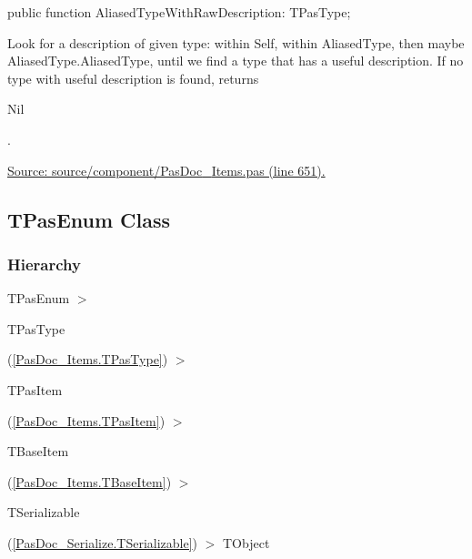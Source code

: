 \documentclass{report}
\newif\ifpdf
\begin{document}
\label{PasDoc_Items.TPasAliasType-AliasedTypeWithRawDescription}
\begin{list}{}{
\setlength{\itemindent}{0cm}
\setlength{\listparindent}{0cm}
\setlength{\leftmargin}{\evensidemargin}
\addtolength{\leftmargin}{\tmplength}
\settowidth{\labelsep}{X}
\addtolength{\leftmargin}{\labelsep}
\setlength{\labelwidth}{\tmplength}
}
\item[\textbf{Declaration}\hfill]
\ifpdf
\begin{flushleft}
\fi
\begin{ttfamily}
public function AliasedTypeWithRawDescription: TPasType;\end{ttfamily}

\ifpdf
\end{flushleft}
\fi

\par
\item[\textbf{Description}]
Look for a description of given type: within Self, within AliasedType, then maybe AliasedType.AliasedType, until we find a type that has a useful description. If no type with useful description is found, returns \begin{ttfamily}Nil\end{ttfamily}.\par
\href{https://github.com/pasdoc/pasdoc/blob/master/source/component/PasDoc_Items.pas#L651}{Source: source/component/PasDoc{\_}Items.pas (line 651).}

\end{list}
\ifpdf
\subsection*{\large{\textbf{TPasEnum Class}}\normalsize\hspace{1ex}\hrulefill}
\else
\subsection*{TPasEnum Class}
\fi
\label{PasDoc_Items.TPasEnum}
\subsubsection*{\large{\textbf{Hierarchy}}\normalsize\hspace{1ex}\hfill}
TPasEnum {$>$} \begin{ttfamily}TPasType\end{ttfamily}(\ref{PasDoc_Items.TPasType}) {$>$} \begin{ttfamily}TPasItem\end{ttfamily}(\ref{PasDoc_Items.TPasItem}) {$>$} \begin{ttfamily}TBaseItem\end{ttfamily}(\ref{PasDoc_Items.TBaseItem}) {$>$} \begin{ttfamily}TSerializable\end{ttfamily}(\ref{PasDoc_Serialize.TSerializable}) {$>$} 
TObject
\end{document}
